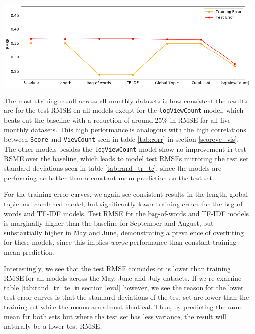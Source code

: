 \documentclass[11pt,preprint, authoryear]{article}
\let\origfigure\figure
\let\endorigfigure\endfigure
\renewenvironment{figure}[1][2] {
    \expandafter\origfigure\expandafter[H]
} {
    \endorigfigure
}
\begin{document}
\normalsize

\footnotesize

\begin{figure}
\caption{\textbf{Model Training and Test RMSEs for September 2009}}
\label{fig:sept_res}

\includegraphics[width=1\linewidth]{../../01-python-code/00-workspace/01-eda/01-graphs/Sep-09-rmse-results} 
\end{figure}

\normalsize

The most striking result across all monthly datasets is how consistent
the results are for the test RMSE on all models except for the
\texttt{logViewCount} model, which beats out the baseline with a
reduction of around 25\% in RMSE for all five monthly datasets. This
high performance is analogous with the high correlations between
\texttt{Score} and \texttt{ViewCount} seen in table \ref{tab:corr} in
section \ref{scorevc_vis}. The other models besides the
\texttt{logViewCount} model show no improvement in test RSME over the
baseline, which leads to model test RMSEs mirroring the test set
standard deviations seen in table \ref{tab:rand_tr_te}, since the models
are performing no better than a constant mean prediction on the test
set.

For the training error curves, we again see consistent results in the
length, global topic and combined model, but significantly lower
training errors for the bag-of-words and TF-IDF models. Test RMSE for
the bag-of-words and TF-IDF models is marginally higher than the
baseline for September and August, but substantially higher in May and
June, demonstrating a prevalence of overfitting for these models, since
this implies \emph{worse} performance than constant training mean
prediction.

Interestingly, we see that the test RMSE coincides or is lower than
training RMSE for all models across the May, June and July datasets. If
we re-examine table \ref{tab:rand_tr_te} in section \ref{eval} however,
we see the reason for the lower test error curves is that the standard
deviations of the test set are lower than the training set while the
means are almost identical. Thus, by predicting the same mean for both
sets but where the test set has less variance, the result will naturally
be a lower test RMSE.
\end{document}
